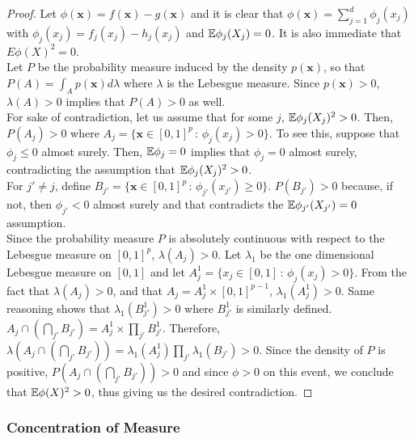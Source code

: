 \begin{proof}

Let $\phi(\mathbf{x}) = f(\mathbf{x}) - g(\mathbf{x})$ and it is clear that $\phi(\mathbf{x}) = \sum_{j=1}^d \phi_j(x_j)$ with $\phi_j(x_j) = f_j(x_j) - h_j(x_j)$ and ${\mathbb E} \phi_j(X_j) = 0$. It is also immediate that $E \phi(X)^2 = 0$. \\

Let $P$ be the probability measure induced by the density $p(\mathbf{x})$, so that $P(A) = \int_A p(\mathbf{x}) d\lambda$ where $\lambda$ is the Lebesgue measure. Since $p(\mathbf{x}) > 0$, $\lambda(A) > 0$ implies that $P(A) > 0$ as well. \\

For sake of contradiction, let us assume that for some $j$, ${\mathbb E} \phi_j(X_j)^2 > 0$. Then, $P(A_j ) > 0$ where $A_j = \{ \mathbf{x} \in [0,1]^p \,:\, \phi_j(x_j) > 0 \}$. To see this, suppose that $\phi_j \leq 0$ almost surely. Then, ${\mathbb E} \phi_j = 0$ implies that $\phi_j = 0$ almost surely, contradicting the assumption that ${\mathbb E} \phi_j(X_j)^2 > 0$.\\

For $j' \neq j$, define $B_{j'} = \{ \mathbf{x} \in [0,1]^p \,:\, \phi_{j'}(x_{j'}) \geq 0 \}$. $P( B_{j'} ) > 0$ because, if not, then $\phi_{j'} < 0$ almost surely and that contradicts the ${\mathbb E} \phi_{j'}(X_{j'}) = 0$ assumption. \\

Since the probability measure $P$ is absolutely continuous with respect to the Lebesgue measure on $[0, 1]^p$, $\lambda (A_j) > 0$. Let $\lambda_1$ be the one dimensional Lebesgue measure on $[0,1]$ and let $A^1_j = \{ x_j \in [0,1] \,:\, \phi_j(x_j) > 0\}$. From the fact that $\lambda(A_j) > 0$, and that $A_j = A^1_j \times [0,1]^{p-1}$, $\lambda_1(A^1_j) > 0$. Same reasoning shows that $\lambda_1(B^1_{j'}) > 0$ where $B^1_{j'}$ is similarly defined.\\

$A_j \cap \left( \bigcap_{j'} B_{j'} \right) = A^1_j \times \prod_{j'} B^1_{j'}$. Therefore, $\lambda ( A_j \cap \left( \bigcap_{j'} B_{j'} \right) ) = \lambda_1(A^1_j)  \prod_{j'} \lambda_1 (B_{j'}) > 0$. Since the density of $P$ is positive, $P( A_j \cap \left( \bigcap_{j'} B_{j'} \right) ) > 0$ and since $\phi > 0$ on this event, we conclude that ${\mathbb E} \phi(X)^2 > 0$, thus giving us the desired contradiction.

\end{proof}

\subsubsection{Concentration of Measure}

